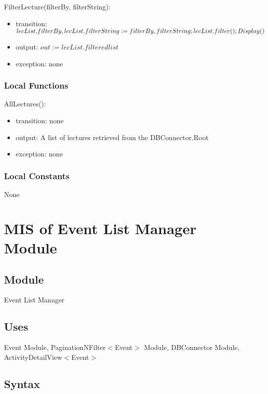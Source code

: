 \documentclass[12pt, titlepage]{article}
\begin{document}
\noindent FilterLecture(filterBy, filterString):
\begin{itemize}
\item transition: $lecList.filterBy, lecList.filterString := filterBy, filterString;\\lecList.filter(); Display()$
\item output: $out := lecList.filteredlist$
\item exception: none
\end{itemize}
\subsubsection{Local Functions}

\noindent AllLectures():
\begin{itemize}
\item transition: none
\item output: A list of lectures retrieved from the DBConnector.Root
\item exception: none
\end{itemize}

\subsubsection{Local Constants}

None

\newpage

\section{MIS of Event List Manager Module} \label{mEL}

\subsection{Module}

Event List Manager

\subsection{Uses}

Event Module, PaginationNFilter$<$Event$>$ Module, DBConnector Module,\\ ActivityDetailView$<$Event$>$

\subsection{Syntax}
\end{document}

